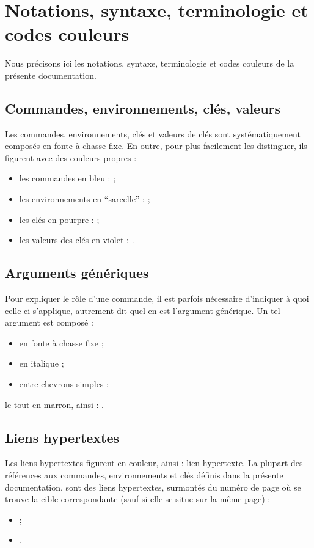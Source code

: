 \documentclass[french,nolocaltoc]{nwejmart}
\newtheorem[title=Fait,style=definition]{fact}
\begin{document}
\section{Notations, syntaxe, terminologie et codes couleurs}\label{sec-synt-term-notat}

Nous précisons ici les notations, syntaxe, terminologie et codes couleurs de
la présente documentation.

\subsection{Commandes, environnements, clés, valeurs}\label{sec-comm-envir-cles}

Les commandes, environnements, clés et valeurs de clés sont systématiquement
composés en fonte à chasse fixe. En outre, pour plus facilement les
distinguer, ils figurent avec des couleurs propres :
\begin{itemize}
\item les commandes en bleu :  ;
\item les environnements en \enquote{sarcelle} :
   ;
\item les clés en pourpre :  ;
\item les valeurs des clés en violet : .
\end{itemize}

\subsection{Arguments génériques}
\label{sec-arguments-generiques}

Pour expliquer le rôle d'une commande, il est parfois nécessaire d'indiquer
à quoi celle-ci s'applique, autrement dit quel en est l'argument générique.
Un tel argument est composé :
\begin{itemize}
\item en fonte à chasse fixe ;
\item en italique ;
\item entre chevrons simples ;
\end{itemize}
le tout en marron, ainsi : .

\subsection{Liens hypertextes}
\label{sec-liens-hypertextes}

Les liens hypertextes figurent en couleur, ainsi :
\href{http://gte.univ-littoral.fr/members/dbitouze/pub/latex}{lien hypertexte}.
La plupart des références aux commandes, environnements et clés définis dans la
présente documentation, sont des liens hypertextes, surmontés du numéro de page
où se trouve la cible correspondante (sauf si elle se situe sur la même page) :
\begin{itemize}
\item {} ;
\item {}.
\end{itemize}
\end{document}
